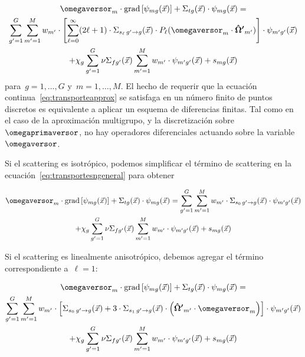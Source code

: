 \begin{multline}\label{eq:transportesngeneral}
 \omegaversor_m \cdot \text{grad} \left[ \psi_{mg}(\vec{x}) \right]
 + \Sigma_{t g}(\vec{x}) \cdot \psi_{mg}(\vec{x}) = \\
  \sum_{g^\prime=1}^G \sum_{m^\prime=1}^M w_{m^\prime} \cdot
\left[  \sum_{\ell=0}^\infty (2\ell+1) \cdot \Sigma_{s_\ell \,g^\prime \rightarrow g}(\vec{x}) \cdot P_\ell (\omegaversor_m \cdot \boldsymbol{\hat{\Omega}^\prime}_{m^\prime}) \right]
 \cdot \psi_{m^\prime g^\prime}(\vec{x}) \\
+ \chi_g \sum_{g^\prime=1}^G \nu\Sigma_{fg^\prime}(\vec{x}) \sum_{m^\prime=1}^M w_{m^\prime} \cdot \psi_{m^\prime g^\prime}(\vec{x})
+ s_{mg}(\vec{x})
\end{multline}
%
para~$g=1,\dots,G$ y~$m=1,\dots,M$. El hecho de requerir que la ecuación continua~\eqref{eq:transporteapprox} se satisfaga en un número finito de puntos discretos es equivalente a aplicar un esquema de diferencias finitas. Tal como en el caso de la aproximación multigrupo, y la discretización sobre~$\omegaprimaversor$, no hay operadores diferenciales actuando sobre la variable~$\omegaversor$.

\medskip

Si el scattering es isotrópico, podemos simplificar el término de scattering en la ecuación~\eqref{eq:transportesngeneral} para obtener

\begin{multline*}
 \omegaversor_m \cdot \text{grad} \left[ \psi_{mg}(\vec{x}) \right]
 + \Sigma_{t g}(\vec{x}) \cdot \psi_{mg}(\vec{x}) = 
 \sum_{g^\prime=1}^G \sum_{m^\prime=1}^M w_{m^\prime} \cdot \Sigma_{s_0 \, g^\prime \rightarrow g}(\vec{x}) \cdot \psi_{m^\prime g^\prime}(\vec{x}) \\
+ \chi_g \sum_{g^\prime=1}^G \nu\Sigma_{fg^\prime}(\vec{x}) \sum_{m^\prime=1}^M w_{m^\prime} \cdot \psi_{m^\prime g^\prime}(\vec{x})
+ s_{mg}(\vec{x})
\end{multline*}

\medskip

Si el scattering es linealmente anisotrópico, debemos agregar el término correspondiente a~$\ell=1$:

\begin{multline*}
 \omegaversor_m \cdot \text{grad} \left[ \psi_{mg}(\vec{x}) \right]
 + \Sigma_{t g}(\vec{x}) \cdot \psi_{mg}(\vec{x}) = \\
 \sum_{g^\prime=1}^G \sum_{m^\prime=1}^M w_{m^\prime} \cdot \left[ \Sigma_{s_0 \, g^\prime \rightarrow g}(\vec{x}) + 3 \cdot \Sigma_{s_1 \, g^\prime \rightarrow g}(\vec{x}) \cdot \left( \boldsymbol{\hat{\Omega}^\prime}_{m^\prime} \cdot \omegaversor_m \right) \right] \cdot \psi_{m^\prime g^\prime}(\vec{x}) \\
+ \chi_g \sum_{g^\prime=1}^G \nu\Sigma_{fg^\prime}(\vec{x}) \sum_{m^\prime=1}^M w_{m^\prime} \cdot \psi_{m^\prime g^\prime}(\vec{x})
+ s_{mg}(\vec{x})
\end{multline*}

